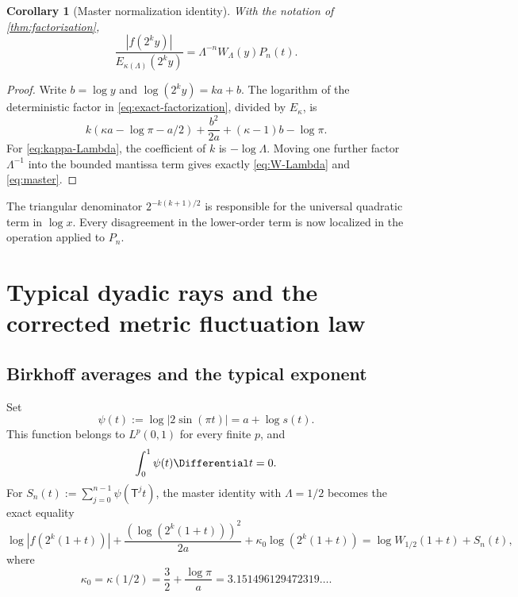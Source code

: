 \documentclass[11pt,oneside]{article}
\newtheorem{corollary}[theorem]{Corollary}
\theoremstyle{definition}
\theoremstyle{remark}
\newcommand{\T}{\mathsf T}
\begin{document}
\begin{corollary}[Master normalization identity]
\label{cor:master}
With the notation of \cref{thm:factorization},
\begin{equation}
 \boxed{
 \frac{|f(2^ky)|}{E_{\kappa(\Lambda)}(2^ky)}
 =\Lambda^{-n}W_\Lambda(y)P_n(t).}
 \label{eq:master}
\end{equation}
\end{corollary}

\begin{proof}
Write $b=\log y$ and $\log(2^ky)=ka+b$.  The logarithm of the deterministic
factor in \eqref{eq:exact-factorization}, divided by $E_\kappa$, is
\[
 k(\kappa a-\log\pi-a/2)
 +\frac{b^2}{2a}+(\kappa-1)b-\log\pi.
\]
For \eqref{eq:kappa-Lambda}, the coefficient of $k$ is $-\log\Lambda$.
Moving one further factor $\Lambda^{-1}$ into the bounded mantissa term gives
exactly \eqref{eq:W-Lambda} and \eqref{eq:master}.
\end{proof}

The triangular denominator $2^{-k(k+1)/2}$ is responsible for the universal
quadratic term in $\log x$.  Every disagreement in the lower-order term is now
localized in the operation applied to $P_n$.

\section{Typical dyadic rays and the corrected metric fluctuation law}
\label{sec:metric}

\subsection{Birkhoff averages and the typical exponent}

Set
\begin{equation}
 \psi(t):=\log|2\sin(\pi t)|=a+\log s(t).
 \label{eq:psi}
\end{equation}
This function belongs to $L^p(0,1)$ for every finite $p$, and
\begin{equation}
 \int_0^1\psi(t)\Differential t=0.
 \label{eq:psi-mean}
\end{equation}
For $S_n(t):=\sum_{j=0}^{n-1}\psi(\T^jt)$, the master identity with
$\Lambda=1/2$ becomes the exact equality
\begin{equation}
 \log|f(2^k(1+t))|
 +\frac{(\log(2^k(1+t)))^2}{2a}
 +\kappa_0\log(2^k(1+t))
 =\log W_{1/2}(1+t)+S_n(t),
 \label{eq:exact-centered}
\end{equation}
where
\begin{equation}
 \kappa_0=\kappa(1/2)
 =\frac32+\frac{\log\pi}{a}
 =3.151496129472319\ldots .
 \label{eq:kappa0}
\end{equation}
\end{document}
